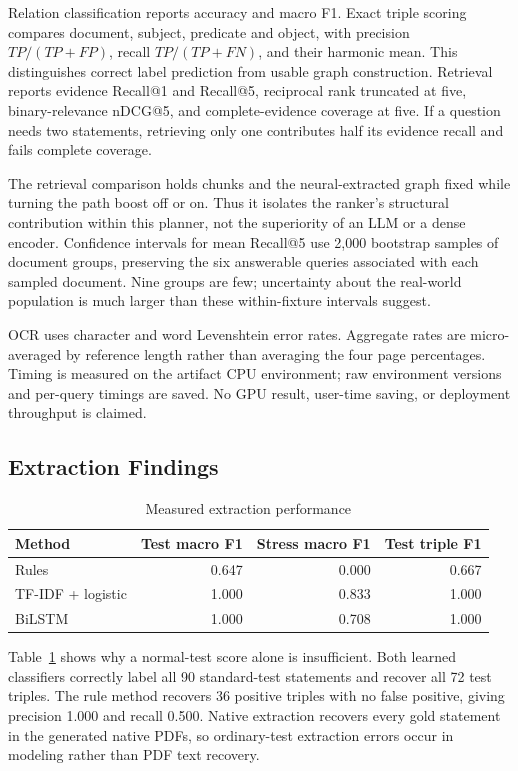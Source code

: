 \documentclass[conference]{IEEEtran}
\begin{document}
Relation classification reports accuracy and macro F1. Exact triple scoring compares document, subject, predicate and object, with precision $TP/(TP+FP)$, recall $TP/(TP+FN)$, and their harmonic mean. This distinguishes correct label prediction from usable graph construction. Retrieval reports evidence Recall@1 and Recall@5, reciprocal rank truncated at five, binary-relevance nDCG@5, and complete-evidence coverage at five. If a question needs two statements, retrieving only one contributes half its evidence recall and fails complete coverage.

The retrieval comparison holds chunks and the neural-extracted graph fixed while turning the path boost off or on. Thus it isolates the ranker's structural contribution within this planner, not the superiority of an LLM or a dense encoder. Confidence intervals for mean Recall@5 use 2,000 bootstrap samples of document groups, preserving the six answerable queries associated with each sampled document. Nine groups are few; uncertainty about the real-world population is much larger than these within-fixture intervals suggest.

OCR uses character and word Levenshtein error rates. Aggregate rates are micro-averaged by reference length rather than averaging the four page percentages. Timing is measured on the artifact CPU environment; raw environment versions and per-query timings are saved. No GPU result, user-time saving, or deployment throughput is claimed.

\subsection{Extraction Findings}
\begin{table}[t]
\centering\caption{Measured extraction performance}
\label{tab:extract}
\begin{tabular}{lrrr}\toprule
Method & Test macro F1 & Stress macro F1 & Test triple F1\\\midrule
Rules & 0.647 & 0.000 & 0.667\\
TF-IDF + logistic & 1.000 & 0.833 & 1.000\\
BiLSTM & 1.000 & 0.708 & 1.000\\\bottomrule
\end{tabular}
\end{table}

Table~\ref{tab:extract} shows why a normal-test score alone is insufficient. Both learned classifiers correctly label all 90 standard-test statements and recover all 72 test triples. The rule method recovers 36 positive triples with no false positive, giving precision 1.000 and recall 0.500. Native extraction recovers every gold statement in the generated native PDFs, so ordinary-test extraction errors occur in modeling rather than PDF text recovery.
\end{document}

